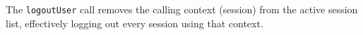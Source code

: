 The \verb+logoutUser+ call removes the calling context (session) from the active session list, effectively logging out
every session using that context.

